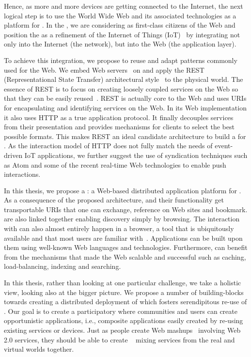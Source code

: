 Hence, as more and more devices are getting connected to the Internet, the next logical step is to use the World Wide Web and its associated technologies as a platform for \sts{}. In the \important{\WoTLong{} (\WoT{})}, we are considering \sts{} as first-class citizens of the Web and position the \WoT{} as a refinement of the Internet of Things (IoT)~\cite{Mattern2005,Mattern2010a,Sarma2001a} by integrating \sts{} not only into the Internet (the network), but into the Web (the application layer). 

To achieve this integration, we propose to reuse and adapt patterns commonly used for the Web. We embed Web servers~\cite{Hui2008,Duquennoy2009,Guinard2009} on \sts{} and apply the REST (Representational State Transfer) architectural style~\cite{Fielding2000,Richardson2007} to the physical world. The essence of REST is to focus on creating loosely coupled services on the Web so that they can be easily reused~\cite{Pautasso2009}. REST is actually core to the Web and uses URIs for encapsulating and identifying services on the Web. In its Web implementation it also uses HTTP as a true application protocol. It finally decouples services from their presentation and provides mechanisms for clients to select the best possible formats. This makes REST an ideal candidate architecture to build a  for \sts{}. As the  interaction model of HTTP does not fully match the needs of event-driven IoT applications, we further suggest the use of syndication techniques such as Atom and some of the recent real-time Web technologies to enable \sts{} push interactions.


In this thesis, we propose a \WoTA{}: a Web-based distributed application platform for \sts{}. As a consequence of the proposed architecture, \sts{} and their functionality get transportable URIs that one can exchange, reference on Web sites and bookmark. \stsBeg{} are also linked together enabling discovery simply by browsing. The interaction with \sts{} can also almost entirely happen in a browser, a tool that is ubiquitously available and that most users are familiar with~\cite{Kindberg2002}. Applications can be built upon them using well-known Web languages and technologies. Furthermore, \sts{} can benefit from the mechanisms that made the Web scalable and successful such as caching, load-balancing, indexing and searching.

In this thesis, rather than looking at one particular challenge, we take a holistic view, looking also at the bigger picture. We propose a number of building-blocks towards creating a distributed deployment of \sts{} which fosters serendipitous re-use of \sts{}. Our goal is to create a participatory \WoT{} where communities and users can create opportunistic applications, i.e., composite applications easily created by re-using existing services or devices. Just as people create Web mashups~\cite{Hartmann2008} involving Web 2.0 services, they should be able to create \important{\pMashups{}}~\cite{Guinard2010-WoT} mixing services from the real and virtual worlds together. 


